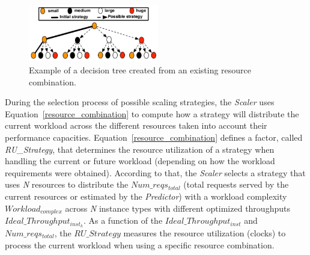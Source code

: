 \begin{figure}[t]
  \begin{center}
    \includegraphics[width=0.7\linewidth,height=2.5cm]{images/optimalTree_initial}
  \end{center}
\vspace{-3mm}
  \caption{Example of a decision tree created from an existing resource combination.}
  \label{fig:scalingTree}
\end{figure}

During the selection process of possible scaling strategies, the \emph{Scaler} uses Equation~\ref{resource_combination} to compute how a strategy will distribute the current workload across the different resources taken into account their performance capacities.  Equation~\ref{resource_combination} defines a factor, called \emph{RU\_Strategy}, that determines the resource utilization of a strategy when handling the current or future workload (depending on how the workload requirements were obtained). According to that, the \emph{Scaler} selects a strategy that uses \emph{N} resources to distribute the \emph{$Num\_reqs_{total}$} (total requests served by the current resources or estimated by the \emph{Predictor}) with a workload complexity \emph{$Workload_{complex}$} across \emph{N} instance types with different optimized throughputs \emph{$Ideal\_Throughput_{inst_{k}}$}. As a function of the \emph{$Ideal\_Throughput_{inst}$} and \emph{$Num\_reqs_{total}$}, the \emph{$RU\_Strategy$} measures the resource utilization (clocks) to process the current workload when using a specific resource combination.





